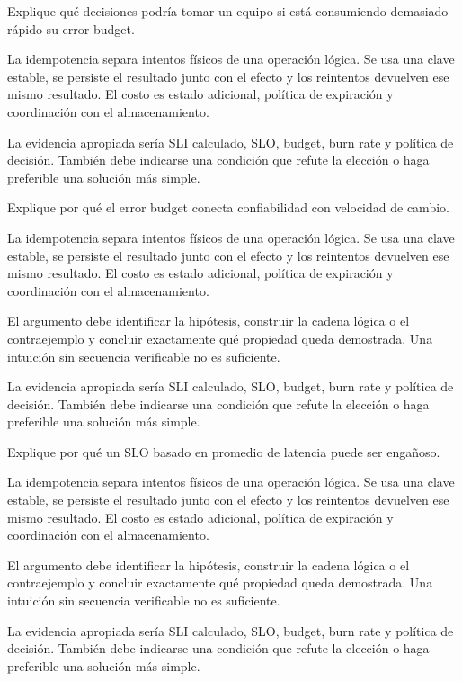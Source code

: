 \documentclass[variant=guia,cover=institutional,mode=screen]{ua-engineering-v6-article}
\begin{document}
\begin{uaexercise}
Explique qué decisiones podría tomar un equipo si está consumiendo demasiado rápido su error budget.
\end{uaexercise}
\begin{uaanswer}
La idempotencia separa intentos físicos de una operación lógica. Se usa una clave estable, se persiste el resultado junto con el efecto y los reintentos devuelven ese mismo resultado. El costo es estado adicional, política de expiración y coordinación con el almacenamiento.

La evidencia apropiada sería SLI calculado, SLO, budget, burn rate y política de decisión. También debe indicarse una condición que refute la elección o haga preferible una solución más simple.
\end{uaanswer}

\begin{uaexercise}
Explique por qué el error budget conecta confiabilidad con velocidad de cambio.
\end{uaexercise}
\begin{uaanswer}
La idempotencia separa intentos físicos de una operación lógica. Se usa una clave estable, se persiste el resultado junto con el efecto y los reintentos devuelven ese mismo resultado. El costo es estado adicional, política de expiración y coordinación con el almacenamiento.

El argumento debe identificar la hipótesis, construir la cadena lógica o el contraejemplo y concluir exactamente qué propiedad queda demostrada. Una intuición sin secuencia verificable no es suficiente.

La evidencia apropiada sería SLI calculado, SLO, budget, burn rate y política de decisión. También debe indicarse una condición que refute la elección o haga preferible una solución más simple.
\end{uaanswer}

\begin{uaexercise}
Explique por qué un SLO basado en promedio de latencia puede ser engañoso.
\end{uaexercise}
\begin{uaanswer}
La idempotencia separa intentos físicos de una operación lógica. Se usa una clave estable, se persiste el resultado junto con el efecto y los reintentos devuelven ese mismo resultado. El costo es estado adicional, política de expiración y coordinación con el almacenamiento.

El argumento debe identificar la hipótesis, construir la cadena lógica o el contraejemplo y concluir exactamente qué propiedad queda demostrada. Una intuición sin secuencia verificable no es suficiente.

La evidencia apropiada sería SLI calculado, SLO, budget, burn rate y política de decisión. También debe indicarse una condición que refute la elección o haga preferible una solución más simple.
\end{uaanswer}
\end{document}
